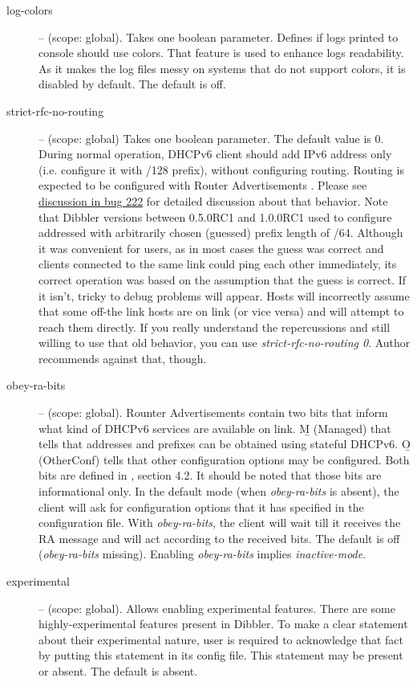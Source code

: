 \begin{description}
\item[log-colors] -- (scope: global). Takes one boolean parameter.
  Defines if logs printed to console should use colors. That feature
  is used to enhance logs readability.  As it makes the log files
  messy on systems that do not support colors, it is disabled by
  default. The default is off.

 \item[strict-rfc-no-routing] -- (scope: global) Takes one boolean
  parameter. The default value is 0. During normal operation, DHCPv6
  client should add IPv6 address only (i.e. configure it with /128
  prefix), without configuring routing. Routing is expected to be
  configured with Router Advertisements \cite{rfc4861}. Please see
  \href{http://klub.com.pl/bugzilla3/show_bug.cgi?id=222}{discussion
  in bug 222} for detailed discussion about that behavior. Note that
  Dibbler versions between 0.5.0RC1 and 1.0.0RC1 used to configure
  addressed with arbitrarily chosen (guessed) prefix length of /64.
  Although it was convenient for users, as in most cases the guess
  was correct and clients connected to the same link could ping each
  other immediately, its correct operation was based on the assumption
  that the guess is correct. If it isn't, tricky to debug problems
  will appear. Hosts will incorrectly assume that some off-the link
  hosts are on link (or vice versa) and will attempt to reach them
  directly. If you really understand the repercussions and still
  willing to use that old behavior, you can
  use \emph{strict-rfc-no-routing 0}. Author recommends against
  that, though.

\item[obey-ra-bits] -- (scope: global). Rounter Advertisements contain
  two bits that inform what kind of DHCPv6 services are available on
  link. \b M (Managed) that tells that addresses and prefixes can be
  obtained using stateful DHCPv6. \b O (OtherConf) tells that other
  configuration options may be configured. Both bits are defined
  in \cite{rfc4861}, section 4.2. It should be noted that those bits
  are informational only. In the default mode
  (when \emph{obey-ra-bits} is absent), the client will ask for
  configuration options that it has specified in the configuration
  file. With \emph{obey-ra-bits}, the client will wait till it
  receives the RA message and will act according to the received
  bits. The default is off (\emph{obey-ra-bits}
  missing). Enabling \emph{obey-ra-bits} implies \emph{inactive-mode}.

\item[experimental] -- (scope: global). Allows enabling experimental
features. There are some highly-experimental features present in
Dibbler. To make a clear statement about their experimental nature,
user is required to acknowledge that fact by putting this statement in
its config file. This statement may be present or absent. The default
is absent.


\end{description}
